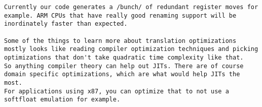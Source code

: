 \begin{Verbatim}[fontsize=\footnotesize]
Currently our code generates a /bunch/ of redundant register moves for
example. ARM CPUs that have really good renaming support will be
inordinately faster than expected.

Some of the things to learn more about translation optimizations
mostly looks like reading compiler optimization techniques and picking
optimizations that don't take quadratic time complexity like that.
So anything compiler theory can help out JITs. There are of course
domain specific optimizations, which are what would help JITs the
most.
For applications using x87, you can optimize that to not use a
softfloat emulation for example.
\end{Verbatim}

\pagebreak